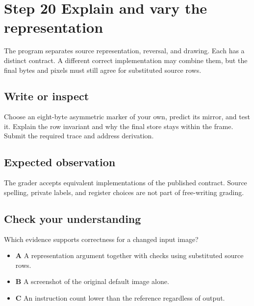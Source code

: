 \section{Step 20 Explain and vary the
  representation}\label{003-eight-byte-sprite-s20-step-20-explain-and-vary-the-representation}

The program separates source representation, reversal, and drawing. Each
has a distinct contract. A different correct implementation may combine
them, but the final bytes and pixels must still agree for substituted
source rows.

\subsection{Write or
  inspect}\label{003-eight-byte-sprite-s20-write-or-inspect}

Choose an eight-byte asymmetric marker of your own, predict its mirror,
and test it. Explain the row invariant and why the final store stays
within the frame. Submit the required trace and address derivation.

\subsection{Expected
  observation}\label{003-eight-byte-sprite-s20-expected-observation}

The grader accepts equivalent implementations of the published contract.
Source spelling, private labels, and register choices are not part of
free-writing grading.

\subsection{Check your
  understanding}\label{003-eight-byte-sprite-s20-check-your-understanding}

Which evidence supports correctness for a changed input image?

\begin{itemize}
  \tightlist
  \item
        \textbf{A} A representation argument together with checks using
        substituted source rows.
  \item
        \textbf{B} A screenshot of the original default image alone.
  \item
        \textbf{C} An instruction count lower than the reference regardless of
        output.
\end{itemize}
